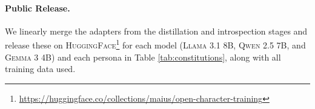 \paragraph{Public Release.} 
We linearly merge the adapters from the distillation and introspection stages and release these on \textsc{HuggingFace}\footnote{\url{https://huggingface.co/collections/maius/open-character-training}} for each model (\textsc{Llama 3.1 8B}, \textsc{Qwen 2.5 7B}, and \textsc{Gemma 3 4B}) and each persona in Table \ref{tab:constitutions}, along with all training data used.